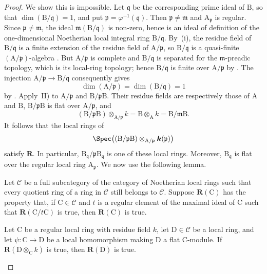 \begin{proof}
We show this is impossible. Let $\mathfrak{q}$ be the corresponding prime ideal of $\mathrm{B}$, so that $\dim(\mathrm{B}/\mathfrak{q})=1$, and put $\mathfrak{p}=\varphi^{-1}(\mathfrak{q})$. Then $\mathfrak{p}\neq\mathfrak{m}$ and $\mathrm{A}_\mathfrak{p}$ is regular. Since $\mathfrak{p}\neq\mathfrak{m}$, the ideal $\mathfrak{m}(\mathrm{B}/\mathfrak{q})$ is non-zero, hence is an ideal of definition of the one-dimensional Noetherian local integral ring $\mathrm{B}/\mathfrak{q}$. By~(i), the residue field of $\mathrm{B}/\mathfrak{q}$ is a finite extension of the residue field of $\mathrm{A}/\mathfrak{p}$, so $\mathrm{B}/\mathfrak{q}$ is a quasi-finite $(\mathrm{A}/\mathfrak{p})$-algebra . But $\mathrm{A}/\mathfrak{p}$ is complete and $\mathrm{B}/\mathfrak{q}$ is separated for the $\mathfrak{m}$-preadic topology, which is its local-ring topology; hence $\mathrm{B}/\mathfrak{q}$ is finite over $\mathrm{A}/\mathfrak{p}$ by . The injection $\mathrm{A}/\mathfrak{p}\to\mathrm{B}/\mathfrak{q}$ consequently gives
\[
  \dim(\mathrm{A}/\mathfrak{p})=\dim(\mathrm{B}/\mathfrak{q})=1
\]
by . Apply~II) to $\mathrm{A}/\mathfrak{p}$ and $\mathrm{B}/\mathfrak{p}\mathrm{B}$. Their residue fields are respectively those of $\mathrm{A}$ and $\mathrm{B}$, $\mathrm{B}/\mathfrak{p}\mathrm{B}$ is flat over $\mathrm{A}/\mathfrak{p}$, and
\[
 (\mathrm{B}/\mathfrak{p}\mathrm{B})\otimes_{\mathrm{A}/\mathfrak{p}}k
 =\mathrm{B}\otimes_\mathrm{A}k=\mathrm{B}/\mathfrak{m}\mathrm{B}.
\]
It follows that the local rings of
\[
 \Spec\bigl((\mathrm{B}/\mathfrak{p}\mathrm{B})\otimes_{\mathrm{A}/\mathfrak{p}}\boldsymbol{k}(\mathfrak{p})\bigr)
\]
satisfy $\boldsymbol{R}$. In particular, $\mathrm{B}_\mathfrak{q}/\mathfrak{p}\mathrm{B}_\mathfrak{q}$ is one of these local rings. Moreover, $\mathrm{B}_\mathfrak{q}$ is flat over the regular local ring $\mathrm{A}_\mathfrak{p}$. We now use the following lemma.

\begin{lemma}[7.5.1.1]
\label{IV.7.5.1.1}
Let $\mathcal{C}$ be a full subcategory of the category of Noetherian local rings such that every quotient ring of a ring in $\mathcal{C}$ still belongs to $\mathcal{C}$. Suppose $\boldsymbol{R}(\mathrm{C})$ has the property that, if $\mathrm{C}\in\mathcal{C}$ and $t$ is a regular element of the maximal ideal of $\mathrm{C}$ such that $\boldsymbol{R}(\mathrm{C}/t\mathrm{C})$ is true, then $\boldsymbol{R}(\mathrm{C})$ is true.

Let $\mathrm{C}$ be a regular local ring with residue field $k$, let $\mathrm{D}\in\mathcal{C}$ be a local ring, and let $\psi:\mathrm{C}\to\mathrm{D}$ be a local homomorphism making $\mathrm{D}$ a flat $\mathrm{C}$-module. If $\boldsymbol{R}(\mathrm{D}\otimes_\mathrm{C}k)$ is true, then $\boldsymbol{R}(\mathrm{D})$ is true.
\end{lemma}


\end{proof}
